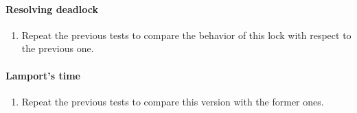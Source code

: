 \documentclass[a4paper, 10pt]{article}
\begin{document}
\paragraph[bold]{Resolving deadlock}
\begin{enumerate}

\item Repeat the previous tests to compare the behavior of this lock with respect to the previous one.

\end{enumerate}

\paragraph[bold]{Lamport’s time}
\begin{enumerate}

\item Repeat the previous tests to compare this version with the former ones.

\end{enumerate}

\newpage
\end{document}
